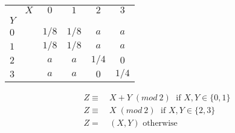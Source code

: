 
		\begin{center}
		\begin{tabular}{|l r||c|c|c|c|}
		    \hline 
		    		 &	$X$ & $0$ & $1$ & $2$ & $3$ \\ 
		    $Y$ &		  &		&			&			&		\\
		    \hline 
		    \hline
		    $0$ &		   & $1/8$ & $1/8$ & $a$ & $a$ \\ 
		    \hline 
		    $1$ &		   & $1/8$ & $1/8$ & $a$ & $a$ \\ 
		    \hline 
		    $2$ &		   & $a$ & $a$ & $1/4$ & $0$ \\ 
		    \hline 
		    $3$ &		   & $a$ & $a$ & $0$ & $1/4$ \\ 
		    \hline 
		  \end{tabular} 
	\end{center}
	
	\begin{align*}
			Z \equiv&\: X + Y\; (mod\: 2)\; \text{ if } X,Y \in \{ 0,1\}\\
	    	Z \equiv&\: X\; (mod\: 2)\; \text{ if } X,Y \in \{ 2,3\}\\
	    	Z =&\: (X,Y) \text{ otherwise} 
	\end{align*}
	
